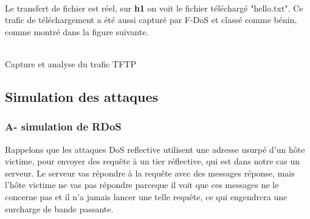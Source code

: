 \paragraph{}
Le transfert de fichier est réel, sur \textbf{h1} on voit le fichier téléchargé "hello.txt". Ce trafic de téléchargement a été aussi capturé par F-DoS et classé comme bénin, comme montré dans la figure suivante.

\begin{center}
\noindent{}%
\newline
\decoRule\\
Capture et analyse du trafic TFTP
\end{center}

\subsection{Simulation des attaques}
\subsubsection{A- simulation de RDoS}
Rappelons que les attaques DoS reflective utilisent une adresse usurpé d'un hôte victime, pour envoyer des requête à un tier réflective, qui est dans notre cas un serveur. Le serveur vas répondre à la requête avec des messages réponse, mais l'hôte victime ne vas pas répondre parceque il voit que ces messages ne le concerne pas et il n'a jamais lancer une telle requête, ce qui engendrera une surcharge de bande passante.\\

